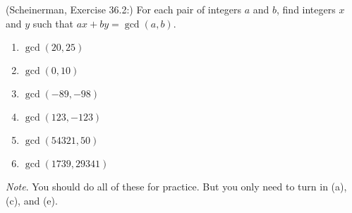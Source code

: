 \documentclass{article}
\theoremstyle{definition}
\newenvironment{note}{\noindent\emph{Note}.}{}
\begin{document}
\begin{question}
    (Scheinerman, Exercise 36.2:)
    For each pair of integers $a$ and $b$, find integers $x$ and $y$
    such that $ax+by = \gcd(a,b)$.
    \begin{enumerate}
        \item $\gcd(20,25)$
        \item $\gcd(0,10)$
        \item $\gcd(-89,-98)$
        \item $\gcd(123,-123)$
        \item $\gcd(54321,50)$
        \item $\gcd(1739,29341)$
    \end{enumerate}
\begin{note}
    You should do all of these for practice.
    But you only need to turn in (a), (c), and (e).
\end{note}
\end{question}
\end{document}
